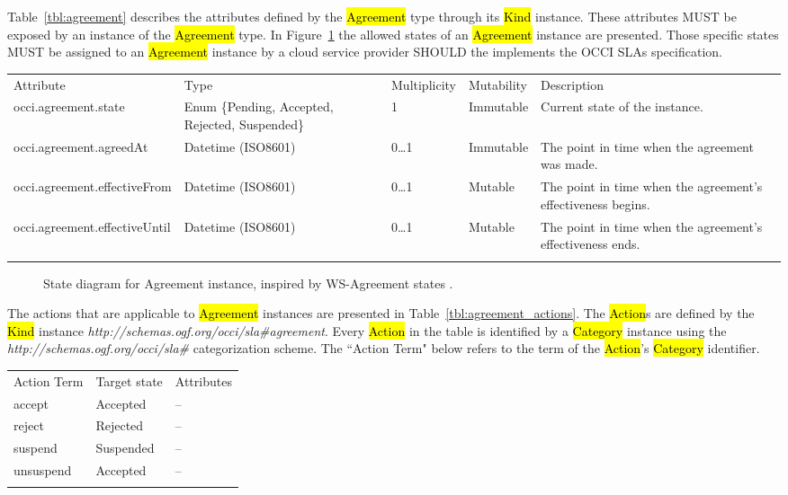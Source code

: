\documentclass[10pt,a4paper]{article}
\begin{document}
Table~\ref{tbl:agreement} describes the attributes defined by the \hl{Agreement} type through its \hl{Kind} instance. These attributes MUST be exposed by an instance of the \hl{Agreement} type. In Figure~\ref{fig:agreement-states} the allowed states of an \hl{Agreement} instance are presented. Those specific states MUST be assigned to an \hl{Agreement} instance by a cloud service provider SHOULD the implements the OCCI SLAs specification. 


{
	\begin{tabular}{lp{2.5cm}p{1cm}lp{6cm}}
	\toprule
	Attribute&Type&Multi\-plicity&Mutability&Description\\
	\colrule
	occi.agreement.state & Enum \{Pending, Accepted, Rejected, Suspended\} & 1 & Immutable & Current state of the instance.\\
	occi.agreement.agreedAt & Datetime (ISO8601) & 0\ldots1 & Immutable & The point in time when the agreement was made. \\
	occi.agreement.effectiveFrom & Datetime (ISO8601) & 0\ldots1 & Mutable & The point in time when the agreement’s effectiveness begins. \\
	occi.agreement.effectiveUntil & Datetime (ISO8601) & 0\ldots1 & Mutable & The point in time when the agreement’s effectiveness ends. \\
	\botrule
	\end{tabular}
}


\begin{figure}[!h]
	{\centering {} \par}
	\caption{State diagram for Agreement instance, inspired by WS-Agreement states \cite{ws-agreeement:2007} .}
	\label{fig:agreement-states}
\end{figure}


The actions that are applicable to \hl{Agreement} instances are presented in Table~\ref{tbl:agreement_actions}. The \hl{Action}s are defined by the \hl{Kind} instance \textit{http://schemas.ogf.org/occi/sla\#agreement}. Every \hl{Action} in the table is identified by a \hl{Category} instance using the \textit{http://schemas.ogf.org/occi/sla\#} categorization scheme. The “Action Term" below refers to the term of the \hl{Action}'s \hl{Category} identifier.


{
	\begin{tabular}{lll}
	\toprule
	Action Term & Target state & Attributes \\
	\colrule
	accept & Accepted & -- \\
	reject & Rejected & -- \\
	suspend & Suspended & -- \\
	unsuspend & Accepted & -- \\
	\botrule
	\end{tabular}
}
\end{document}
